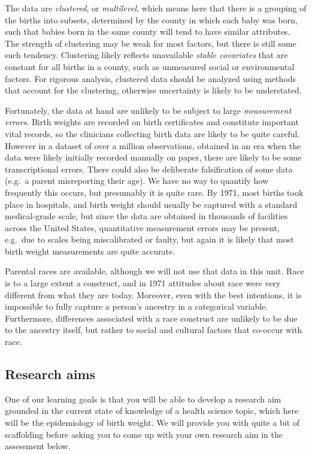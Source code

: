 The data are {\em clustered}, or {\em multilevel}, which means here that there is a grouping of the births into subsets, determined by the county in which each baby was born, such that babies born in the same county will tend to have similar attributes.  The strength of clustering may be weak for most factors, but there is still some such tendency.  Clustering likely reflects unavailable {\em stable covariates} that are constant for all births in a county, such as unmeasured social or environmental factors.  For rigorous analysis, clustered data should be analyzed using methods that account for the clustering, otherwise uncertainty is likely to be understated.

Fortunately, the data at hand are unlikely to be subject to large {\em measurement errors}. Birth weights are recorded on birth certificates and constitute important vital records, so the clinicians collecting birth data are likely to be quite careful.  However in a dataset of over a million observations, obtained in an era when the data were likely initially recorded manually on paper, there are likely to be some transcriptional errors.  There could also be deliberate falsification of some data (e.g.\ a parent misreporting their age).  We have no way to quantify how frequently this occurs, but presumably it is quite rare.  By 1971, most births took place in hospitals, and birth weight should usually be captured with a standard medical-grade scale, but since the data are obtained in thousands of facilities across the United States, quantitative measurement errors may be present, e.g.\ due to scales being miscalibrated or faulty, but again it is likely that most birth weight measurements are quite accurate.

Parental races are available, although we will not use that data in this unit.  Race is to a large extent a construct, and in 1971 attitudes about race were very different from what they are today.  Moreover, even with the best intentions, it is impossible to fully capture a person's ancestry in a categorical variable. Furthermore, differences associated with a race construct are unlikely to be due to the ancestry itself, but rather to social and cultural factors that co-occur with race.

\subsection{Research aims}

One of our learning goals is that you will be able to develop a research aim grounded in the current state of knowledge of a health science topic, which here will be the epidemiology of birth weight.  We will provide you with quite a bit of scaffolding before asking you to come up with your own research aim in the assessment below.

